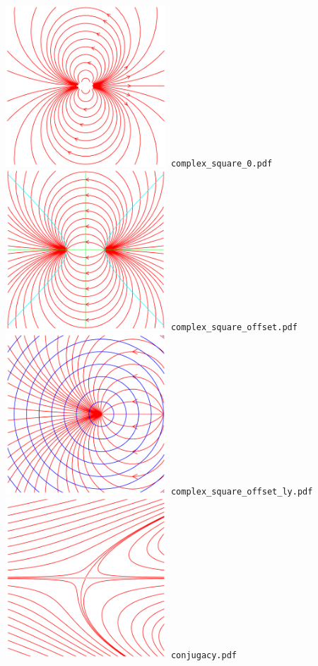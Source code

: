 \documentclass[a4paper]{amsart}
\begin{document}
\includegraphics[width=6cm]{complex_square_0.pdf}\verb+ complex_square_0.pdf+\\
\includegraphics[width=6cm]{complex_square_offset.pdf}\verb+ complex_square_offset.pdf+\\
\includegraphics[width=6cm]{complex_square_offset_ly.pdf}\verb+ complex_square_offset_ly.pdf+\\
\includegraphics[width=6cm]{conjugacy.pdf}\verb+ conjugacy.pdf+\\
\end{document}
